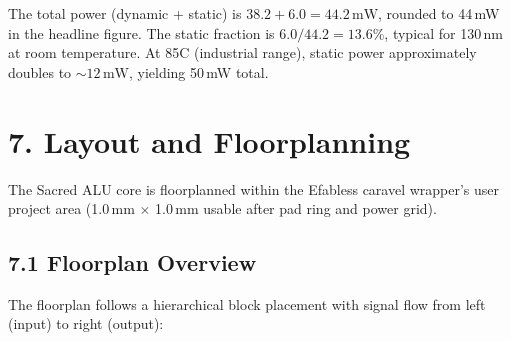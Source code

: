 The total power (dynamic + static) is \(38.2 + 6.0 = 44.2\,\text{mW}\),
rounded to 44\,mW in the headline figure. The static fraction is
\(6.0 / 44.2 = 13.6\%\), typical for 130\,nm at room temperature.
At 85\textdegree C (industrial range), static power approximately
doubles to \(\sim 12\,\text{mW}\), yielding 50\,mW total.

\section{7. Layout and Floorplanning}\label{fa_72:layout-floorplanning}

The Sacred ALU core is floorplanned within the Efabless caravel
wrapper's user project area (1.0\,mm \(\times\) 1.0\,mm usable after
pad ring and power grid).

\subsection{7.1 Floorplan Overview}

The floorplan follows a hierarchical block placement with signal flow
from left (input) to right (output):

